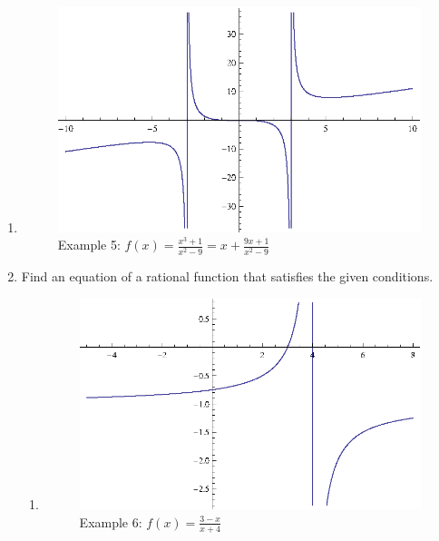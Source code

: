 \documentclass{exam}
\begin{document}
\begin{enumerate}
    \item
      \begin{figure}[H]
        \centering
        \includegraphics[scale=1.0]{example5.eps}
        \caption*{Example 5: $f(x) = \frac{x^3+1}{x^2-9} = x + \frac{9x + 1}{x^2-9}$}
      \end{figure}

      \pagebreak

    \item Find an equation of a rational function that satisfies the given conditions.

      \begin{enumerate}[a]
        \item 

          \begin{figure}[H]
            \centering
            \includegraphics[scale=1.0]{example6.eps}
            \caption*{Example 6: $f(x) = \frac{3 - x}{x + 4}$}
          \end{figure}


\end{enumerate}
\end{enumerate}
\end{document}
